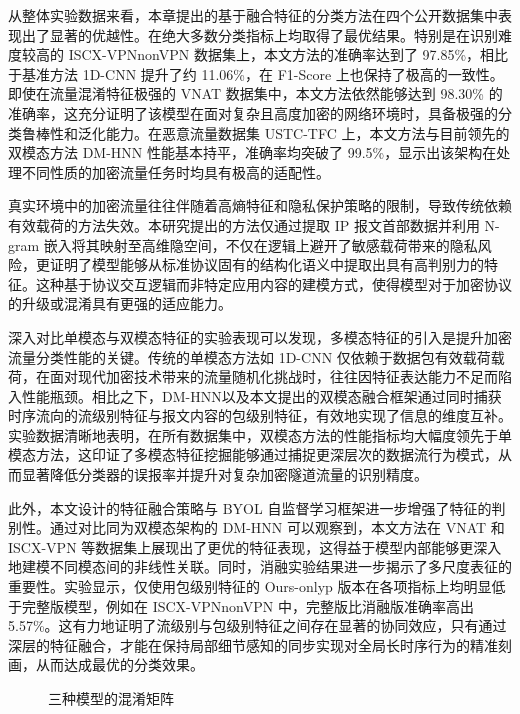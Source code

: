 从整体实验数据来看，本章提出的基于融合特征的分类方法在四个公开数据集中表现出了显著的优越性。在绝大多数分类指标上均取得了最优结果。特别是在识别难度较高的 ISCX-VPNnonVPN 数据集上，本文方法的准确率达到了 97.85\%，相比于基准方法 1D-CNN 提升了约 11.06\%，在 F1-Score 上也保持了极高的一致性。即使在流量混淆特征极强的 VNAT 数据集中，本文方法依然能够达到 98.30\% 的准确率，这充分证明了该模型在面对复杂且高度加密的网络环境时，具备极强的分类鲁棒性和泛化能力。在恶意流量数据集 USTC-TFC 上，本文方法与目前领先的双模态方法 DM-HNN 性能基本持平，准确率均突破了 99.5\%，显示出该架构在处理不同性质的加密流量任务时均具有极高的适配性。

真实环境中的加密流量往往伴随着高熵特征和隐私保护策略的限制，导致传统依赖有效载荷的方法失效。本研究提出的方法仅通过提取 IP 报文首部数据并利用 N-gram 嵌入将其映射至高维隐空间，不仅在逻辑上避开了敏感载荷带来的隐私风险，更证明了模型能够从标准协议固有的结构化语义中提取出具有高判别力的特征。这种基于协议交互逻辑而非特定应用内容的建模方式，使得模型对于加密协议的升级或混淆具有更强的适应能力。

深入对比单模态与双模态特征的实验表现可以发现，多模态特征的引入是提升加密流量分类性能的关键。传统的单模态方法如 1D-CNN 仅依赖于数据包有效载荷载荷，在面对现代加密技术带来的流量随机化挑战时，往往因特征表达能力不足而陷入性能瓶颈。相比之下，DM-HNN以及本文提出的双模态融合框架通过同时捕获时序流向的流级别特征与报文内容的包级别特征，有效地实现了信息的维度互补。实验数据清晰地表明，在所有数据集中，双模态方法的性能指标均大幅度领先于单模态方法，这印证了多模态特征挖掘能够通过捕捉更深层次的数据流行为模式，从而显著降低分类器的误报率并提升对复杂加密隧道流量的识别精度。

此外，本文设计的特征融合策略与 BYOL 自监督学习框架进一步增强了特征的判别性。通过对比同为双模态架构的 DM-HNN 可以观察到，本文方法在 VNAT 和 ISCX-VPN 等数据集上展现出了更优的特征表现，这得益于模型内部能够更深入地建模不同模态间的非线性关联。同时，消融实验结果进一步揭示了多尺度表征的重要性。实验显示，仅使用包级别特征的 Ours-onlyp 版本在各项指标上均明显低于完整版模型，例如在 ISCX-VPNnonVPN 中，完整版比消融版准确率高出 5.57\%。这有力地证明了流级别与包级别特征之间存在显著的协同效应，只有通过深层的特征融合，才能在保持局部细节感知的同步实现对全局长时序行为的精准刻画，从而达成最优的分类效果。

\begin{figure}[ht]
  \centering
  \caption{三种模型的混淆矩阵}
  \label{fig:confusionB}
\end{figure}

